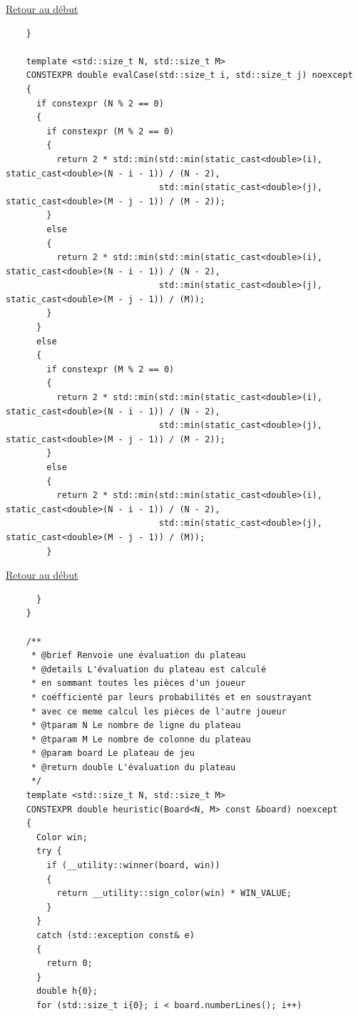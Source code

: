 {\begin{frame}[fragile]
\hyperlink{conclusion}{Retour au début}\newline
\begin{verbatim}
    }

    template <std::size_t N, std::size_t M>
    CONSTEXPR double evalCase(std::size_t i, std::size_t j) noexcept
    {
      if constexpr (N % 2 == 0)
      {
        if constexpr (M % 2 == 0)
        {
          return 2 * std::min(std::min(static_cast<double>(i), static_cast<double>(N - i - 1)) / (N - 2),
                              std::min(static_cast<double>(j), static_cast<double>(M - j - 1)) / (M - 2));
        }
        else
        {
          return 2 * std::min(std::min(static_cast<double>(i), static_cast<double>(N - i - 1)) / (N - 2),
                              std::min(static_cast<double>(j), static_cast<double>(M - j - 1)) / (M));
        }
      }
      else
      {
        if constexpr (M % 2 == 0)
        {
          return 2 * std::min(std::min(static_cast<double>(i), static_cast<double>(N - i - 1)) / (N - 2),
                              std::min(static_cast<double>(j), static_cast<double>(M - j - 1)) / (M - 2));
        }
        else
        {
          return 2 * std::min(std::min(static_cast<double>(i), static_cast<double>(N - i - 1)) / (N - 2),
                              std::min(static_cast<double>(j), static_cast<double>(M - j - 1)) / (M));
        }
\end{verbatim}
\end{frame}

\begin{frame}[fragile]
\hyperlink{conclusion}{Retour au début}\newline
\begin{verbatim}
      }
    }

    /**
     * @brief Renvoie une évaluation du plateau
     * @details L'évaluation du plateau est calculé
     * en sommant toutes les pièces d'un joueur
     * coéfficienté par leurs probabilités et en soustrayant
     * avec ce meme calcul les pièces de l'autre joueur
     * @tparam N Le nombre de ligne du plateau
     * @tparam M Le nombre de colonne du plateau
     * @param board Le plateau de jeu
     * @return double L'évaluation du plateau
     */
    template <std::size_t N, std::size_t M>
    CONSTEXPR double heuristic(Board<N, M> const &board) noexcept
    {
      Color win;
      try {
        if (__utility::winner(board, win))
        {
          return __utility::sign_color(win) * WIN_VALUE;
        }
      }
      catch (std::exception const& e)
      {
        return 0;
      }
      double h{0};
      for (std::size_t i{0}; i < board.numberLines(); i++)
\end{verbatim}
\end{frame}

}
